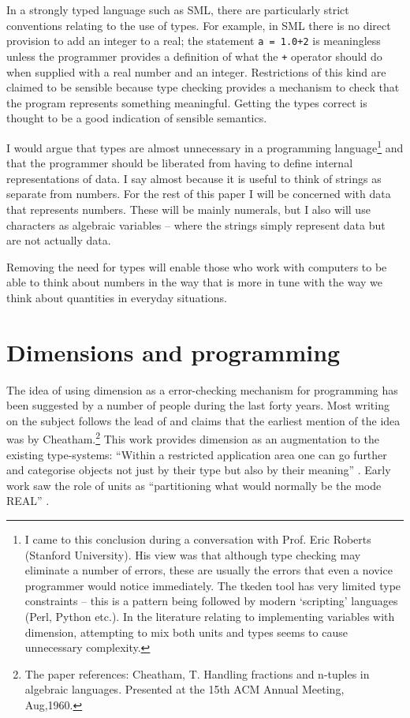 \documentclass[a4paper]{article}
\begin{document}
In a strongly typed language such as SML, there are particularly strict 
conventions relating to the use of types. For example, in SML there is no 
direct provision to add an integer to a real; the statement {{\texttt{a = 
1.0+2}}} is meaningless unless the programmer provides a definition of what the 
\texttt{+} operator should do when supplied with a real number and an integer. 
Restrictions of this kind are claimed to be sensible because type checking 
provides a mechanism to check that the program represents something 
meaningful. Getting the types correct is thought to be a good indication of 
sensible semantics.

I would argue that types are almost unnecessary in a programming 
language\footnote{I came to this conclusion during a conversation with Prof. 
Eric Roberts (Stanford University). His view was that although type checking 
may eliminate a number of  errors, these are usually the errors that even a 
novice programmer would notice immediately. The tkeden tool has very limited 
type constraints -- this is a pattern being followed by modern `scripting' 
languages (Perl, Python etc.). In the 
literature relating to implementing variables with dimension, attempting to mix 
both units and types seems to
cause unnecessary complexity.} and that the programmer should be liberated from 
having to define internal representations of data. I say almost because it is 
useful to think of strings as separate from numbers. For the rest of this paper 
I will be concerned with data that represents numbers.
These will be mainly numerals, but I also will use characters as algebraic 
variables -- where the strings simply represent data but are not actually data.

Removing the need for types will enable those who work with computers to be 
able to think about numbers in the way that is more in tune with the way we 
think about quantities in everyday situations. 

\section{Dimensions and programming}

The idea of using dimension as a error-checking mechanism for programming 
has been suggested by a number of people during the last forty years. 
Most writing on the subject follows the lead of \cite{ME_karrLoveman} and 
claims that the earliest mention of the idea was by Cheatham.\footnote{The 
paper references: Cheatham, T. Handling fractions and n-tuples in algebraic 
languages. Presented at the 15th ACM Annual Meeting, Aug,1960.} 
This work provides dimension as an augmentation to the 
existing type-systems: ``Within a restricted application area one can go 
further and categorise objects not just by their type but also by their 
meaning'' \cite{ME_trg_progCog}. Early work saw the role of units as 
``partitioning
what would normally be the mode REAL'' \cite{ME_karrLoveman}.
\end{document}
